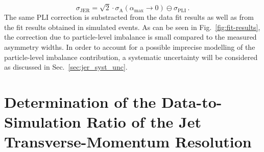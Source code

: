 \begin{equation}
\sigma_\mathrm{JER} =  \sqrt{2} \cdot \sigma_\mathrm{A}(\alpha_\mathrm{max} \rightarrow 0) \ominus \sigma_\mathrm{PLI} \, .
\end{equation}  
The same PLI correction is substracted from the data fit results as well as from the fit results obtained in simulated events. As can be seen in Fig.~\ref{fig:fit-results}, the correction due to particle-level imbalance is small compared to the measured asymmetry widths. In order to account for a possible imprecise modelling of the particle-level imbalance contribution, a systematic uncertainty will be considered as discussed in Sec.~\ref{sec:jer_syst_unc}.

\section[Determination of the Data-to-Simulation Ratio]{Determination of the Data-to-Simulation Ratio of the Jet Transverse-Momentum Resolution}
\label{sec:jer_ratio_determination}
